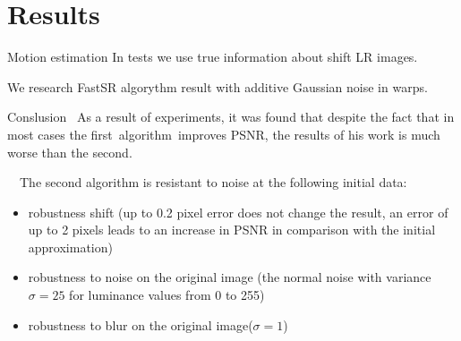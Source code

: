 \section{Results}
\begin{frame}{Motion estimation}
  In tests we use true information about shift LR images.

  We research FastSR algorythm result with additive Gaussian noise in warps.
\end{frame}
\begin{frame}{Conslusion}
 As a result of experiments, it was found that despite the fact that in most cases the first algorithm improves
PSNR, the results of his work is much worse than the second.

  The second algorithm is resistant to noise at the following initial data:
\begin{itemize}
\item robustness shift (up to 0.2 pixel error does not change the result, an error of up to 2 pixels leads to an increase
  in PSNR in comparison with the initial approximation)
\item robustness to noise on the original image (the normal noise with variance $ \sigma = 25 $ for luminance values from 0 to 255)
\item robustness to blur on the original image($\sigma = 1$)
\end{itemize}

\end{frame}
